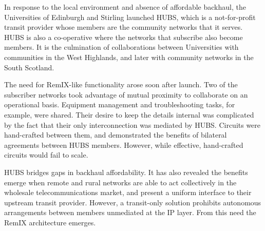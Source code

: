 In response to the local environment and absence of affordable
backhaul, the Universities of Edinburgh and Stirling launched
HUBS, which is a not-for-profit transit provider whose members are the
community networks that it serves.  HUBS is also a co-operative where
the networks that subscribe also become members. It is the culmination
of collaborations between Universities with communities in the West
Highlands, and later with community networks in the South Scotland.

The need for RemIX-like functionality arose soon after launch. Two of
the subscriber networks took advantage of mutual proximity to
collaborate on an operational basis. Equipment management and
troubleshooting tasks, for example, were shared. Their desire to keep
the details internal was complicated by the fact that their only
interconnection was mediated by HUBS. Circuits were hand-crafted
between them, and demonstrated the benefits of bilateral agreements
between HUBS members. However, while effective, hand-crafted circuits
would fail to scale.

HUBS bridges gaps in backhaul affordability. It has also revealed the
benefits emerge when remote and rural networks are able to act
collectively in the wholesale telecommunications market, and present a
uniform interface to their upstream transit provider. However, a
transit-only solution prohibits autonomous arrangements between
members unmediated at the IP layer. From this need the RemIX
architecture emerges.


